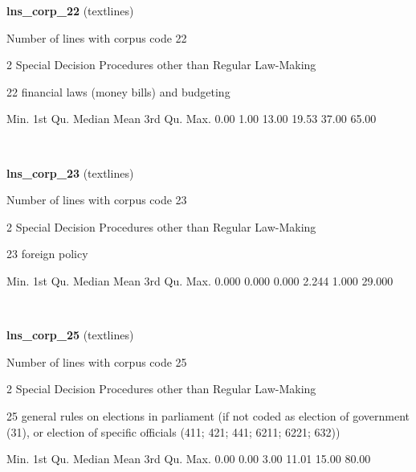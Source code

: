 \documentclass[]{article}
\newenvironment{Shaded}{\begin{snugshade}}{\end{snugshade}}
\newcommand{\FloatTok}[1]{\textcolor[rgb]{0.00,0.00,0.81}{{#1}}}
\newcommand{\NormalTok}[1]{{#1}}
\begin{document}
\textbf{lns\_corp\_22} (textlines)

Number of lines with corpus code 22

2 Special Decision Procedures other than Regular Law-Making

22 financial laws (money bills) and budgeting

\begin{Shaded}
\begin{Highlighting}[]
   \NormalTok{Min. 1st Qu.  Median    Mean 3rd Qu.    Max. }
   \FloatTok{0.00}    \FloatTok{1.00}   \FloatTok{13.00}   \FloatTok{19.53}   \FloatTok{37.00}   \FloatTok{65.00} 
\end{Highlighting}
\end{Shaded}

~

\vspace{1em}

\textbf{lns\_corp\_23} (textlines)

Number of lines with corpus code 23

2 Special Decision Procedures other than Regular Law-Making

23 foreign policy

\begin{Shaded}
\begin{Highlighting}[]
   \NormalTok{Min. 1st Qu.  Median    Mean 3rd Qu.    Max. }
  \FloatTok{0.000}   \FloatTok{0.000}   \FloatTok{0.000}   \FloatTok{2.244}   \FloatTok{1.000}  \FloatTok{29.000} 
\end{Highlighting}
\end{Shaded}

~

\vspace{1em}

\textbf{lns\_corp\_25} (textlines)

Number of lines with corpus code 25

2 Special Decision Procedures other than Regular Law-Making

25 general rules on elections in parliament (if not coded as election of
government (31), or election of specific officials (411; 421; 441; 6211;
6221; 632))

\begin{Shaded}
\begin{Highlighting}[]
   \NormalTok{Min. 1st Qu.  Median    Mean 3rd Qu.    Max. }
   \FloatTok{0.00}    \FloatTok{0.00}    \FloatTok{3.00}   \FloatTok{11.01}   \FloatTok{15.00}   \FloatTok{80.00} 
\end{Highlighting}
\end{Shaded}
\end{document}
